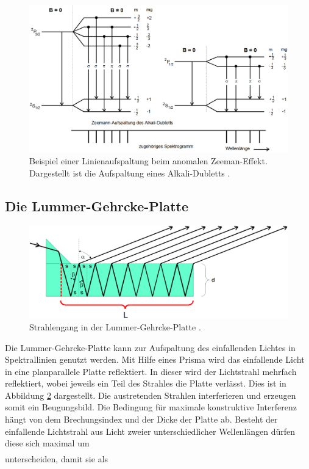 \begin{figure}
	\centering
	\includegraphics[width=\linewidth-50pt,height=\textheight-50pt,keepaspectratio]{content/Images/anomaleAufspaltung.png}
    \caption{Beispiel einer Linienaufspaltung beim anomalen Zeeman-Effekt. Dargestellt ist die Aufspaltung eines Alkali-Du­bletts \cite{V27}.}
    \label{fig:anomaleAufspaltung}
\end{figure}

\subsection{Die Lummer-Gehrcke-Platte}
\begin{figure}
	\centering
	\includegraphics[width=\linewidth-50pt,height=\textheight-50pt,keepaspectratio]{content/Images/lummerPlatte.png}
    \caption{Strahlengang in der Lummer-Gehrcke-Platte \cite{V27}.}
    \label{fig:lummerPlatte}
\end{figure}
Die Lummer-Gehrcke-Platte kann zur Aufspaltung des einfallenden Lichtes in Spektrallinien genutzt werden. Mit Hilfe eines Prisma wird das einfallende Licht in eine planparallele Platte reflektiert. In dieser wird der Lichtstrahl mehrfach reflektiert, wobei jeweils ein Teil des Strahles die Platte verlässt. Dies ist in Abbildung \ref{fig:lummerPlatte} dargestellt. Die austretenden Strahlen interferieren und erzeugen somit ein Beugungsbild. Die Bedingung für maximale konstruktive Interferenz hängt von dem Brechungsindex und der Dicke der Platte ab. Besteht der einfallende Lichtstrahl aus Licht zweier unterschiedlicher Wellenlängen dürfen diese sich maximal um
\begin{gather*}

\end{gather*}
unterscheiden, damit sie als